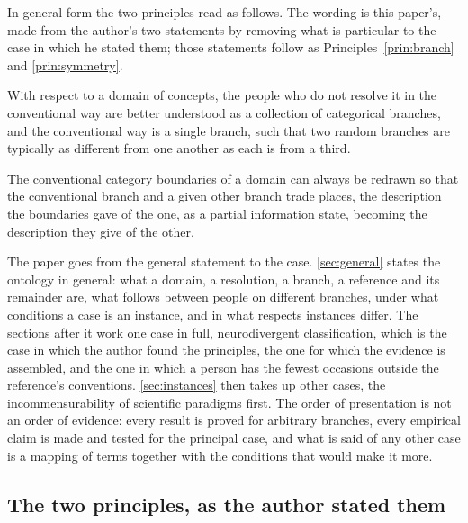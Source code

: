In general form the two principles read as follows. The wording is this paper's, made from the author's two statements by removing what is particular to the case in which he stated them; those statements follow as Principles~\ref{prin:branch} and \ref{prin:symmetry}.

\begin{generalform}
With respect to a domain of concepts, the people who do not resolve it in the conventional way are better understood as a collection of categorical branches, and the conventional way is a single branch, such that two random branches are typically as different from one another as each is from a third.
\end{generalform}

\begin{generalform}
The conventional category boundaries of a domain can always be redrawn so that the conventional branch and a given other branch trade places, the description the boundaries gave of the one, as a partial information state, becoming the description they give of the other.
\end{generalform}

\noindent The paper goes from the general statement to the case. \autoref{sec:general} states the ontology in general: what a domain, a resolution, a branch, a reference and its remainder are, what follows between people on different branches, under what conditions a case is an instance, and in what respects instances differ. The sections after it work one case in full, neurodivergent classification, which is the case in which the author found the principles, the one for which the evidence is assembled, and the one in which a person has the fewest occasions outside the reference's conventions. \autoref{sec:instances} then takes up other cases, the incommensurability of scientific paradigms first. The order of presentation is not an order of evidence: every result is proved for arbitrary branches, every empirical claim is made and tested for the principal case, and what is said of any other case is a mapping of terms together with the conditions that would make it more.

\subsection{The two principles, as the author stated them}
\label{sec:principles}

